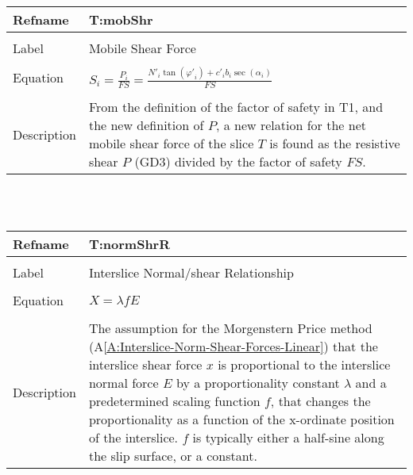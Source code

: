 \documentclass[12pt]{article}
\begin{document}
~\newline
\noindent \begin{minipage}{\textwidth}
\begin{tabular}{p{} p{}}
\toprule \textbf{Refname} & \textbf{T:mobShr}
\label{T:mobShr}
\\ \midrule \\
Label & Mobile Shear Force
\\ \midrule \\
Equation & $S_{i}=\frac{P_{i}}{FS}=\frac{{N'}_{i} \tan\left({φ'}_{i}\right)+{c'}_{i} b_{i} \sec\left(α_{i}\right)}{FS}$
\\ \midrule \\
Description & From the definition of the factor of safety in T1, and the new definition of $P$, a new relation for the net mobile shear force of the slice $T$ is found as the resistive shear $P$ (GD3) divided by the factor of safety $FS$.
\\ \bottomrule \end{tabular}
\end{minipage}\\
~\newline
\noindent \begin{minipage}{\textwidth}
\begin{tabular}{p{} p{}}
\toprule \textbf{Refname} & \textbf{T:normShrR}
\label{T:normShrR}
\\ \midrule \\
Label & Interslice Normal/shear Relationship
\\ \midrule \\
Equation & $X=λ f E$
\\ \midrule \\
Description & The assumption for the Morgenstern Price method (A\ref{A:Interslice-Norm-Shear-Forces-Linear}) that the interslice shear force $x$ is proportional to the interslice normal force $E$ by a proportionality constant $λ$ and a predetermined scaling function $f$, that changes the proportionality as a function of the x-ordinate position of the interslice. $f$ is typically either a half-sine along the slip surface, or a constant.
\\ \bottomrule \end{tabular}
\end{minipage}\\
~\newline
\end{document}
